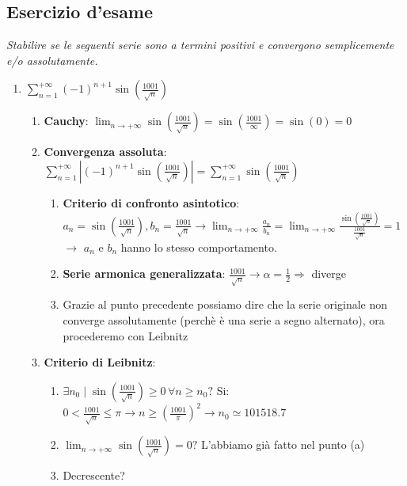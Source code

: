 \documentclass[12pt, a4paper]{article}
\begin{document}
    \subsection{Esercizio d'esame}
        \textit{Stabilire se le seguenti serie sono a termini positivi e convergono semplicemente e/o assolutamente.}
        \begin{enumerate}
            \item $\sum_{n=1}^{+\infty}(-1)^{n+1}\sin\left(\frac{1001}{\sqrt{n}}\right)$ \begin{enumerate}
                \item \textbf{Cauchy}: $\lim_{n\rightarrow+\infty}\sin\left(\frac{1001}{\sqrt{n}}\right)=\sin\left(\frac{1001}{\infty}\right)=\sin(0)=0$
                \item \textbf{Convergenza assoluta}: $\sum_{n=1}^{+\infty}\left|(-1)^{n+1}\sin\left(\frac{1001}{\sqrt{n}}\right)\right|=\sum_{n=1}^{+\infty}\sin\left(\frac{1001}{\sqrt{n}}\right)$ \begin{enumerate}
                    \item \textbf{Criterio di confronto asintotico}: \scriptsize$a_n = \sin\left(\frac{1001}{\sqrt{n}}\right), b_n = \frac{1001}{\sqrt{n}} \rightarrow \lim_{n\rightarrow+\infty}\frac{a_n}{b_n}=\lim_{n\rightarrow+\infty}\frac{\sin\left(\frac{1001}{\sqrt{n}}\right)}{\frac{1001}{\sqrt{n}}}=1$\normalsize \\ $\rightarrow$ $a_n$ e $b_n$ hanno lo stesso comportamento.
                    \item \textbf{Serie armonica generalizzata}: $\frac{1001}{\sqrt{n}}\rightarrow\alpha=\frac{1}{2}\Rightarrow$ diverge
                    \item Grazie al punto precedente possiamo dire che la serie originale non converge assolutamente (perchè è una serie a segno alternato), ora procederemo con Leibnitz
                \end{enumerate}
                \item \textbf{Criterio di Leibnitz}: \begin{enumerate}
                    \item $\exists n_0\mid \sin\left(\frac{1001}{\sqrt{n}}\right)\geq 0\,\forall n\geq n_0?$ Si: $0<\frac{1001}{\sqrt{n}}\leq\pi\rightarrow n\geq\left(\frac{1001}{\pi}\right)^2\rightarrow n_0\simeq 101518.7$
                    \item $\lim_{n\rightarrow+\infty}\sin\left(\frac{1001}{\sqrt{n}}\right)=0?$ L'abbiamo già fatto nel punto (a)
                    \item Decrescente? \begin{enumerate}

\end{enumerate}
\end{enumerate}
\end{enumerate}
\end{enumerate}
\end{document}
